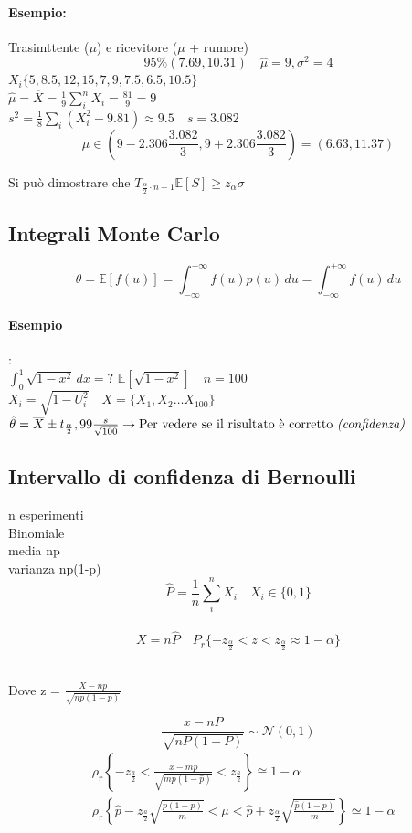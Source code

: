 \documentclass[]{article}
\newcommand{\ev}{\mathbb{E}[X]}
\renewcommand{\ev}[1]{\mathbb{E}[#1]}
\begin{document}
    \paragraph{Esempio:} Trasimttente ($\mu$) e ricevitore ($\mu$ + rumore)
    \[ 95\% (7.69, 10.31) \quad \hat{\mu} = 9, \sigma^2 = 4 \]
    $X_i \{ 5, 8.5, 12, 15, 7, 9, 7.5, 6.5, 10.5 \}$ \\
    $\hat{\mu} = \overline{X} = \frac{1}{9} \sum_{i}^{n} X_i = \frac{81}{9} = 9$ \\
    $s^2 = \frac{1}{8}\sum_{i}^{}(X_i^2-9.81) \approx 9.5 \quad s = 3.082$
    \[ \mu \in (9-2.306 \frac{3.082}{3}, 9 + 2.306 \frac{3.082}{3}) = (6.63, 11.37) \]
    \centerline{Si può dimostrare che $T_{\frac{\alpha}{2} \cdot n - 1} \ev{S} \geq z_\alpha\sigma$}
    \subsection{Integrali Monte Carlo}
    \[ \theta = \ev{f(u)} = \int_{-\infty}^{+\infty} f(u) p(u) \, du = \int_{-\infty}^{+\infty} f(u) \, du \]
    \paragraph{Esempio}: \\
    $\int_{0}^{1} \sqrt{1-x^2} \,dx = ?$
    $\ev{\sqrt{1-x^2}} \quad n = 100$ \\
    $X_i = \sqrt{1 - U_i^2} \quad X = \{ X_1, X_2 \ldots X_100 \}$ \\
    $\hat{\theta} = \overline{X} \pm t_{\frac{\alpha}{2}}, 99 \frac{s}{\sqrt{100}} \rightarrow \text{Per vedere se il risultato è corretto \textit{(confidenza)}}$ 
    \subsection{Intervallo di confidenza di Bernoulli}
    n esperimenti \\
    Binomiale \\
    media np \\
    varianza np(1-p) \\
    \[ \hat{P} = \frac{1}{n} \sum_{i}^{n}X_i \quad X_i \in \{ 0, 1 \} \] \\
    \[ X = n\hat{P} \quad P_r \{ -z_{\frac{\alpha}{2}} < z < z_{\frac{\alpha}{2}} \approx 1-\alpha \}\] \\
    \centerline{Dove z = $\frac{X-np}{\sqrt{np(1-p)}}$}
    \[ \frac{x-nP}{\sqrt{nP(1-P)}} \sim \mathcal{N}(0,1)\]
    \begin{equation}
        \begin{aligned}
        & \rho_r\left\{-z_{\frac{a}{2}}<\frac{x-m p}{\sqrt{m p(1-\hat{p})}}<z_{\frac{a}{2}}\right\} \cong 1-\alpha \\
        & \rho_r\left\{\hat{p}-z_{\frac{a}{2}} \sqrt{\frac{p(1-p)}{m}}<\mu<\hat{p}+z_{\frac{\alpha}{2}} \sqrt{\frac{\hat{p}(1-p)}{m}}\right\} \simeq 1-\alpha
        \end{aligned}
    \end{equation}
\end{document}
